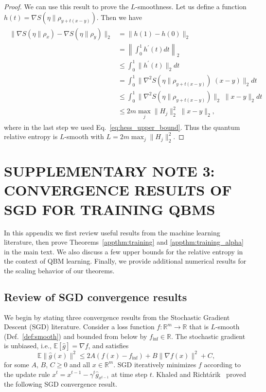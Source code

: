 \documentclass[
    reprint,
    aps,
    prx,
    longbibliography
]{revtex4-2}
\begin{document}
\begin{proof}
We can use this result to prove the $L$-smoothness. Let us define a function $h(t) = \nabla S(\eta \|\rho_{y + t(x - y)})$. Then we have
\begin{align}
\begin{split}
\| \nabla S(\eta \|\rho_{x}) - \nabla S(\eta \|\rho_{y}) \|_2 &= \| h(1) - h(0) \|_2 \\
&= \left\| \int_0^1 h^\prime(t) dt \right\|_2 \\
&\leq \int_0^1 \| h^\prime (t) \|_2 dt \\ 
&= \int_0^1 \| \nabla^2 S(\eta \|\rho_{y + t(x - y)}) \; (x - y) \|_2 dt  \\
&\leq \int_0^1 \| \nabla^2 S(\eta \|\rho_{y + t(x - y)}) \|_2 \; \| x - y \|_2  dt \\
&\leq 2m \max_j \| H_j \|_2^2 \; \| x - y \|_2 ,
\end{split}
\end{align}
where in the last step we used Eq.~\eqref{eq:hess_upper_bound}. Thus the quantum relative entropy is $L$-smooth with $L=2m \max_j \| H_j \|_2^2$.
\end{proof}


\section*{\MakeUppercase{Supplementary Note 3: Convergence results of SGD for training QBMs}}

In this appendix we first review useful results from the machine learning literature, then prove Theorems~\ref{appthm:training} and \ref{appthm:training_alpha} in the main text. We also discuss a few upper bounds for the relative entropy in the context of QBM learning. Finally, we provide additional numerical results for the scaling behavior of our theorems.

\subsection*{Review of SGD convergence results}

We begin by stating three convergence results from the Stochastic Gradient Descent (SGD) literature. Consider a loss function $f : \mathbb{R}^m \rightarrow \mathbb{R}$ that is $L$-smooth (Def.~\ref{def:smooth}) and bounded from below by $f_\mathrm{inf} \in \mathbb{R}$. The stochastic gradient is unbiased, i.e., $\mathbb{E}[\hat{g}] = \nabla f$, and satisfies 
\begin{equation}
    \mathbb{E} \| \hat{g}(x) \|^2  \leq 2A (f(x) - f_\mathrm{inf}) + B \| \nabla f(x) \|^2 + C ,
\end{equation}
for some $A$, $B$, $C \geq 0$ and all $x \in \mathbb{R}^m$.
SGD iteratively minimizes $f$ according to the update rule $x^t = x^{t-1} - \gamma^t \hat{g}_{x^{t-1}}$ at time step $t$. Khaled and Richt{\'a}rik~\cite{Khaled2020} proved the following SGD convergence result.
\end{document}

